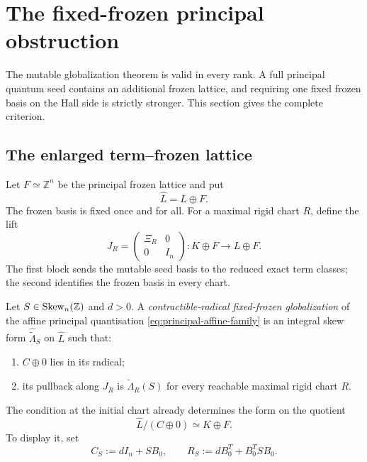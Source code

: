 \section{The fixed-frozen principal obstruction}
\label{sec:principal-obstruction}

The mutable globalization theorem is valid in every rank.  A full principal
quantum seed contains an additional frozen lattice, and requiring one fixed
frozen basis on the Hall side is strictly stronger.  This section gives the
complete criterion.

\subsection{The enlarged term--frozen lattice}

Let $F\simeq\mathbb Z^n$ be the principal frozen lattice and put
\[
 \widehat L=L\oplus F.
\]
The frozen basis is fixed once and for all.  For a maximal rigid chart $R$,
define the lift
\begin{equation}
 J_R=
 \begin{pmatrix}
  \Xi_R&0\\
  0&I_n
 \end{pmatrix}:
 K\oplus F\longrightarrow L\oplus F.
 \label{eq:J-R}
\end{equation}
The first block sends the mutable seed basis to the reduced exact term classes;
the second identifies the frozen basis in every chart.

\begin{definition}
\label{def:full-globalization}
Let $S\in\operatorname{Skew}_n(\mathbb Z)$ and $d>0$.  A
\emph{contractible-radical fixed-frozen globalization} of the affine
principal quantisation \cref{eq:principal-affine-family} is an integral skew
form $\widehat{\widetilde\Lambda}_S$ on $\widehat L$ such that:
\begin{enumerate}[label=(\roman*),leftmargin=2.3em]
\item $C\oplus0$ lies in its radical;
\item its pullback along $J_R$ is
      $\widetilde\Lambda_R(S)$ for every reachable maximal rigid chart $R$.
\end{enumerate}
\end{definition}

The condition at the initial chart already determines the form on the
quotient
\[
 \widehat L/(C\oplus0)\simeq K\oplus F.
\]
To display it, set
\begin{equation}
 C_S:=dI_n+SB_0,
 \qquad
 R_S:=dB_0^T+B_0^TSB_0.
 \label{eq:C-S-R-S}
\end{equation}

